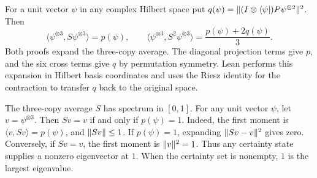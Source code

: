 \begin{lemma}\label{lem:three-copy-moments}
  \leanok
  \par
  For a unit vector $\psi$ in any complex Hilbert space put
  $q(\psi)=\lVert (I\otimes\langle\psi|)P\psi^{\otimes2} \rVert^2$. Then
  \[
    \langle\psi^{\otimes3},S\psi^{\otimes3}\rangle=p(\psi),
    \qquad \langle\psi^{\otimes3},S^2\psi^{\otimes3}\rangle=\frac{p(\psi)+2q(\psi)}{3}.
  \]
  Both proofs expand the three-copy average. The diagonal projection terms give
  $p$, and the six cross terms give $q$ by permutation symmetry. Lean performs
  this expansion in Hilbert basis coordinates and uses the Riesz identity
  for the contraction to transfer $q$ back to the original space.
\end{lemma}

\begin{lemma}\label{lem:triple-certainty}
  \leanok
  \par
  The three-copy average $S$ has spectrum in $[0,1]$. For any unit vector
  $\psi$, let $v=\psi^{\otimes3}$. Then $Sv=v$ if and only if $p(\psi)=1$.
  Indeed, the first moment is $\langle v,Sv\rangle=p(\psi)$, and
  $\lVert Sv \rVert\le1$. If $p(\psi)=1$, expanding $\lVert Sv-v \rVert^2$ gives zero.
  Conversely, if $Sv=v$, the first moment is $\lVert v \rVert^2=1$.
  Thus any certainty state supplies a nonzero eigenvector at $1$.
  When the certainty set is nonempty, $1$ is the largest eigenvalue.
\end{lemma}

